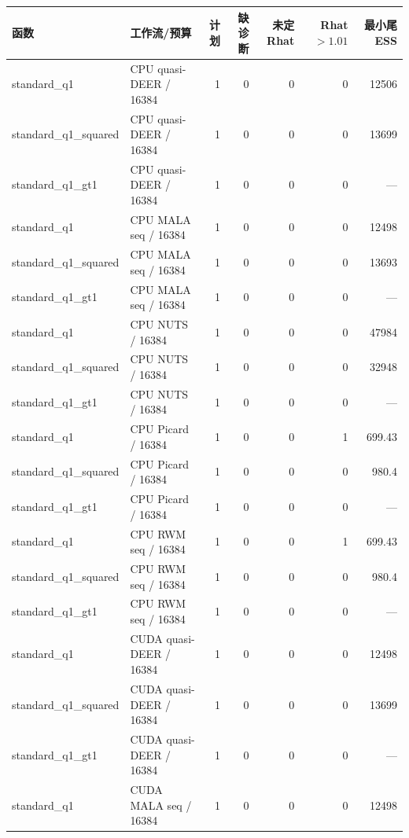 \documentclass[UTF8,fontset=fandol,a4paper]{ctexart}
\begin{document}
\begingroup\footnotesize\begin{longtable}{P{28mm}P{40mm}rrrrr}
\toprule 函数 & 工作流/预算 & 计划 & 缺诊断 & 未定Rhat & Rhat$>1.01$ & 最小尾ESS \\ \midrule\endhead
standard\_\allowbreak{}q1 & CPU quasi-DEER / 16384 & 1 & 0 & 0 & 0 & 12506 \\
standard\_\allowbreak{}q1\_\allowbreak{}squared & CPU quasi-DEER / 16384 & 1 & 0 & 0 & 0 & 13699 \\
standard\_\allowbreak{}q1\_\allowbreak{}gt1 & CPU quasi-DEER / 16384 & 1 & 0 & 0 & 0 & — \\
standard\_\allowbreak{}q1 & CPU MALA seq / 16384 & 1 & 0 & 0 & 0 & 12498 \\
standard\_\allowbreak{}q1\_\allowbreak{}squared & CPU MALA seq / 16384 & 1 & 0 & 0 & 0 & 13693 \\
standard\_\allowbreak{}q1\_\allowbreak{}gt1 & CPU MALA seq / 16384 & 1 & 0 & 0 & 0 & — \\
standard\_\allowbreak{}q1 & CPU NUTS / 16384 & 1 & 0 & 0 & 0 & 47984 \\
standard\_\allowbreak{}q1\_\allowbreak{}squared & CPU NUTS / 16384 & 1 & 0 & 0 & 0 & 32948 \\
standard\_\allowbreak{}q1\_\allowbreak{}gt1 & CPU NUTS / 16384 & 1 & 0 & 0 & 0 & — \\
standard\_\allowbreak{}q1 & CPU Picard / 16384 & 1 & 0 & 0 & 1 & 699.43 \\
standard\_\allowbreak{}q1\_\allowbreak{}squared & CPU Picard / 16384 & 1 & 0 & 0 & 0 & 980.4 \\
standard\_\allowbreak{}q1\_\allowbreak{}gt1 & CPU Picard / 16384 & 1 & 0 & 0 & 0 & — \\
standard\_\allowbreak{}q1 & CPU RWM seq / 16384 & 1 & 0 & 0 & 1 & 699.43 \\
standard\_\allowbreak{}q1\_\allowbreak{}squared & CPU RWM seq / 16384 & 1 & 0 & 0 & 0 & 980.4 \\
standard\_\allowbreak{}q1\_\allowbreak{}gt1 & CPU RWM seq / 16384 & 1 & 0 & 0 & 0 & — \\
standard\_\allowbreak{}q1 & CUDA quasi-DEER / 16384 & 1 & 0 & 0 & 0 & 12498 \\
standard\_\allowbreak{}q1\_\allowbreak{}squared & CUDA quasi-DEER / 16384 & 1 & 0 & 0 & 0 & 13699 \\
standard\_\allowbreak{}q1\_\allowbreak{}gt1 & CUDA quasi-DEER / 16384 & 1 & 0 & 0 & 0 & — \\
standard\_\allowbreak{}q1 & CUDA MALA seq / 16384 & 1 & 0 & 0 & 0 & 12498 \\

\end{longtable}
\end{document}
